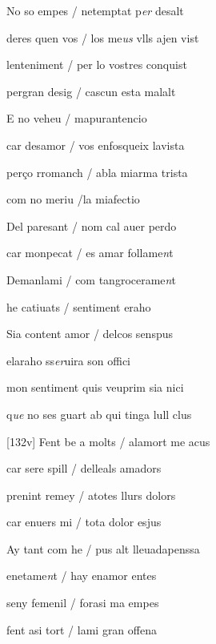 \documentclass[12pt]{article}
\begin{document}
\begin{estrofa}

 No so empes / netemptat p\textit{er} desalt

 deres quen vos / los me\textit{us} vlls ajen vist

 lenteniment / per lo vostres conquist

 pergran desig / cascun esta malalt

 E no veheu / mapurantencio

 car desamor / vos enfosqueix lavista

 per\c{c}o rromanch / abla miarma trista

 com no meriu /la miafectio

\end{estrofa}



\begin{estrofa}

 Del paresant / nom cal auer perdo

 car monpecat / es amar follame\textit{n}t

 Demanlami / com tangrocerame\textit{n}t

 he catiuats / sentiment eraho

 Sia content amor / delcos senspus

 elaraho ss\textit{er}uira son offici

 mon sentiment quis veuprim sia nici

 q\textit{ue} no ses guart ab qui tinga lull
clus

\end{estrofa}



\begin{estrofa}

 [132v] Fent be a molts / alamort me acus

 car sere spill / delleals amadors

 prenint remey / atotes llurs dolors

 car enuers mi / tota dolor esjus

 Ay tant com he / pus alt lleuadapenssa

 enetame\textit{n}t / hay enamor entes

 seny femenil / forasi ma empes

 fent asi tort / lami gran offena

\end{estrofa}
\end{document}
